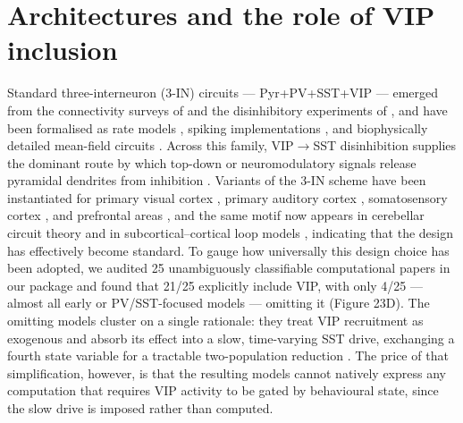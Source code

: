 \documentclass[11pt]{article}
\let\origrightarrow\rightarrow
\def\rightarrow{\ensuremath{\origrightarrow}}
\begin{document}
\section{Architectures and the role of VIP inclusion}

Standard three-interneuron (3-IN) circuits --- Pyr+PV+SST+VIP --- emerged from the connectivity surveys of \citep{Pfeffer2013} and the disinhibitory experiments of \citep{Pi2013, Lee2013, Fu2014}, and have been formalised as rate models \citep{Litwinkumar2016, Garciadelmolino2017, Hertag2019}, spiking implementations \citep{Veit2023}, and biophysically detailed mean-field circuits \citep{Reimann2026, Jadi2012, Isbister2026}. Across this family, VIP\rightarrow SST disinhibition supplies the dominant route by which top-down or neuromodulatory signals release pyramidal dendrites from inhibition \citep{Karnani2016a, Abs2018}. Variants of the 3-IN scheme have been instantiated for primary visual cortex \citep{Hahn2020, Kim2025b}, primary auditory cortex \citep{Park2020, Natan2017}, somatosensory cortex \citep{Hua2022}, and prefrontal areas \citep{Shen2023}, and the same motif now appears in cerebellar circuit theory \citep{Park2023} and in subcortical--cortical loop models \citep{Cattani2024}, indicating that the design has effectively become standard. To gauge how universally this design choice has been adopted, we audited 25 unambiguously classifiable computational papers in our package and found that 21/25 explicitly include VIP, with only 4/25 --- almost all early or PV/SST-focused models --- omitting it (Figure 23D). The omitting models cluster on a single rationale: they treat VIP recruitment as exogenous and absorb its effect into a slow, time-varying SST drive, exchanging a fourth state variable for a tractable two-population reduction \citep{Tahvili2025a, Tahvili2025b}. The price of that simplification, however, is that the resulting models cannot natively express any computation that requires VIP activity to be gated by behavioural state, since the slow drive is imposed rather than computed.
\end{document}

